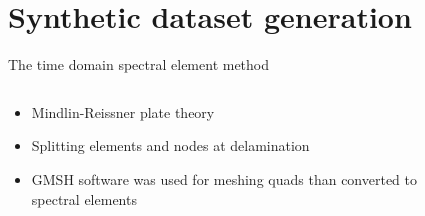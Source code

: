 \documentclass[10pt,aspectratio=169,dvipsnames]{beamer} %
\begin{document}
	\setcounter{subfigure}{0}
	\section{Synthetic dataset generation}
	\begin{frame}{The time domain spectral element method}
	\begin{columns}[T]
		\begin{column}{0.47\textwidth}
			\begin{itemize}
				\item Mindlin-Reissner plate theory
				\item Splitting elements and nodes at delamination
				\item GMSH software was used for meshing quads than converted to spectral elements
			\end{itemize}	
			\begin{figure}
			\end{figure}
		\end{column}
		\begin{column}{0.47\textwidth}	
			\begin{figure}
			\end{figure}	
		\end{column}
	\end{columns}	
	\end{frame}
\end{document}
